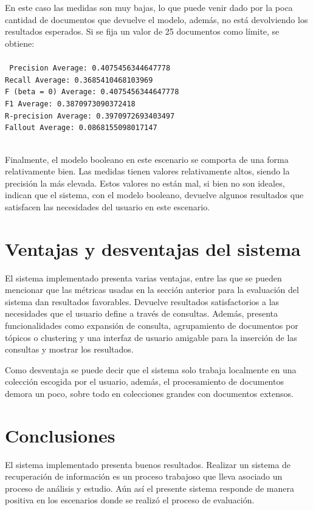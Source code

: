 \documentclass[twoside]{article}
\begin{document}
En este caso las medidas son muy bajas, lo que puede venir dado por la poca cantidad de documentos que devuelve el modelo, adem\'as, no est\'a devolviendo los resultados esperados. Si se fija un valor de 25 documentos como l\'imite, se obtiene:\\\\
\texttt{
Precision Average: 0.4075456344647778 \\
Recall Average: 0.3685410468103969 \\
F (beta = 0) Average: 0.4075456344647778 \\
F1 Average: 0.3870973090372418 \\
R-precision Average: 0.3970972693403497 \\
Fallout Average: 0.0868155098017147 \\\\
}

Finalmente, el modelo booleano en este escenario se comporta de una forma relativamente bien. Las medidas tienen valores relativamente altos, siendo la precisi\'on la m\'as elevada. Estos valores no est\'an mal, si bien no son ideales, indican que el sistema, con el modelo booleano, devuelve algunos resultados que satisfacen las necesidades del usuario en este escenario.

\section{Ventajas y desventajas del sistema}
\qquad El sistema implementado presenta varias ventajas, entre las que se pueden mencionar que las m\'etricas usadas en la secci\'on anterior para la evaluaci\'on del sistema dan resultados favorables. Devuelve resultados satisfactorios a las necesidades que el usuario define a trav\'es de consultas. Adem\'as, presenta funcionalidades como expansi\'on de consulta, agrupamiento de documentos por t\'opicos o clustering y una interfaz de usuario amigable para la inserci\'on de las consultas y mostrar los resultados.

Como desventaja se puede decir que el sistema solo trabaja localmente en una colecci\'on escogida por el usuario, adem\'as, el procesamiento de documentos demora un poco, sobre todo en colecciones grandes con documentos extensos.
 
\section{Conclusiones}
\qquad El sistema implementado presenta buenos resultados. Realizar un sistema de recuperaci\'on de informaci\'on es un proceso trabajoso que lleva asociado un proceso de an\'alisis y estudio. A\'un as\'i el presente sistema responde de manera positiva en los escenarios donde se realiz\'o el proceso de evaluaci\'on. 
\end{document}
